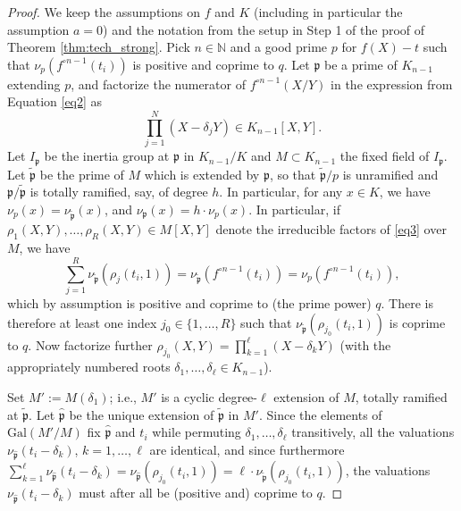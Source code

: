 \documentclass[a4paper]{amsart}
\begin{document}
  \begin{proof}
  We keep the assumptions on $f$ and $K$ (including in particular the assumption $a=0$) and the notation from the setup in Step 1 of the proof of Theorem \ref{thm:tech_strong}. Pick $n\in\mathbb{N}$ and a good prime $p$ for $f(X)-t$
  such that $\nu_p(f^{\circ n-1}(t_i))$ is positive and coprime to $q$. 
  Let $\mathfrak{p}$ be a prime of $K_{n-1}$ extending $p$, and factorize the numerator of $f^{\circ n-1}(X/Y)$ in the expression from Equation \eqref{eq2} as \begin{equation}
  \label{eq3}
  \prod_{j=1}^N (X-\delta_jY)\in K_{n-1}[X,Y].
  \end{equation}
  Let $I_\mathfrak{p}$ be the inertia group at $\mathfrak{p}$ in $K_{n-1}/K$ and $M\subset K_{n-1}$ the fixed field of $I_{\mathfrak{p}}$. Let $\tilde{\mathfrak{p}}$ be the prime of $M$ which is extended by $\mathfrak{p}$, so that $\tilde{\mathfrak{p}}/p$ is unramified and $\mathfrak{p}/\tilde{\mathfrak{p}}$ is totally ramified, say, of degree $h$. In particular, for any $x\in K$, we have $\nu_p(x)=\nu_{\tilde{\mathfrak{p}}}(x)$, and $\nu_{\mathfrak{p}}(x) = h\cdot\nu_p(x)$.
In particular, if $\rho_1(X,Y),\dots, \rho_R(X,Y)\in M[X,Y]$ denote the irreducible factors of \eqref{eq3} over $M$, we have 
$$\sum_{j=1}^{R} \nu_{\tilde{\mathfrak{p}}}(\rho_j(t_i,1))= \nu_{\tilde{\mathfrak{p}}}(f^{\circ n-1}(t_i)) = \nu_{p}(f^{\circ n-1}(t_i)),$$ which by assumption is positive and coprime to (the prime power) $q$. There is therefore at least one index $j_0\in \{1,\dots, R\}$ such that $\nu_{\tilde{\mathfrak{p}}}(\rho_{j_0}(t_i,1))$ is 
coprime to $q$.
Now factorize further $\rho_{j_0}(X,Y) = \prod_{k=1}^\ell (X-\delta_kY)$ (with the appropriately numbered roots $\delta_1,\dots, \delta_\ell\in K_{n-1}$).

Set $M':=M(\delta_1)$; i.e., $M'$ is a cyclic degree-$\ell$ extension of $M$, totally ramified at $\tilde{\mathfrak{p}}$. Let $\widehat{\mathfrak{p}}$ be the unique extension of $\tilde{\mathfrak{p}}$ in $M'$. Since the elements of $\textrm{Gal}(M'/M)$ fix $\widehat{\mathfrak{p}}$ and $t_i$ while permuting $\delta_1,\dots, \delta_\ell$ transitively, all the valuations $\nu_{\widehat{\mathfrak{p}}}(t_i-\delta_k)$, $k=1,\dots, \ell$ are identical, and since furthermore $\sum_{k=1}^\ell \nu_{\widehat{\mathfrak{p}}}(t_i-\delta_k) = \nu_{\widehat{\mathfrak{p}}}(\rho_{j_0}(t_i,1)) = \ell\cdot \nu_{\tilde{\mathfrak{p}}}(\rho_{j_0}(t_i,1))$, the valuations $\nu_{\widehat{\mathfrak{p}}}(t_i-\delta_k)$ must after all be (positive and) coprime to $q$.


\end{proof}
\end{document}
